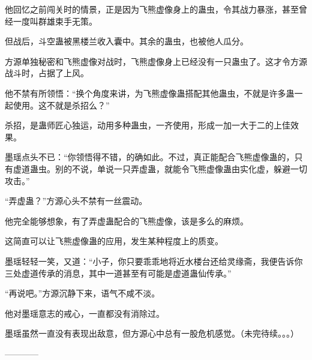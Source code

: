 \begin{this_body}
他回忆之前闯关时的情景，正是因为飞熊虚像身上的蛊虫，令其战力暴涨，甚至曾经一度叫群雄束手无策。

但战后，斗空蛊被黑楼兰收入囊中。其余的蛊虫，也被他人瓜分。

方源单独秘密和飞熊虚像对战时，飞熊虚像身上已经没有一只蛊虫了。这才令方源战斗时，占据了上风。

他不禁有所领悟：“换个角度来讲，为飞熊虚像蛊搭配其他蛊虫，不就是许多蛊一起使用。这不就是杀招么？”

杀招，是蛊师匠心独运，动用多种蛊虫，一齐使用，形成一加一大于二的上佳效果。

墨瑶点头不已：“你领悟得不错，的确如此。不过，真正能配合飞熊虚像蛊的，只有虚道蛊虫。别的不说，单说一只弄虚蛊，就能令飞熊虚像蛊由实化虚，躲避一切攻击。”

“弄虚蛊？”方源心头不禁有一丝震动。

他完全能够想象，有了弄虚蛊配合的飞熊虚像，该是多么的麻烦。

这简直可以让飞熊虚像蛊的应用，发生某种程度上的质变。

墨瑶轻轻一笑，又道：“小子，你只要乖乖地将近水楼台还给灵缘斋，我便告诉你三处虚道传承的消息，其中一道甚至有可能是虚道蛊仙传承。”

“再说吧。”方源沉静下来，语气不咸不淡。

他对墨瑶意志的戒心，一直都没有消除过。

墨瑶虽然一直没有表现出敌意，但方源心中总有一股危机感觉。（未完待续。。。）

------------

\end{this_body}

